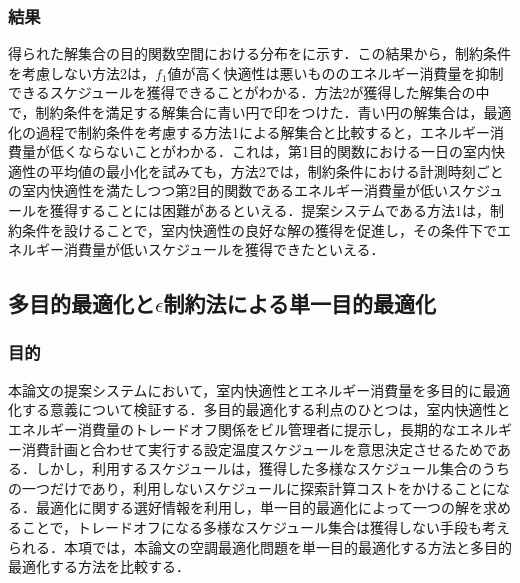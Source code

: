 \subsubsection{結果}
得られた解集合の目的関数空間における分布をに示す．この結果から，制約条件を考慮しない方法2は，$f_1$値が高く快適性は悪いもののエネルギー消費量を抑制できるスケジュールを獲得できることがわかる．方法2が獲得した解集合の中で，制約条件を満足する解集合に青い円で印をつけた．青い円の解集合は，最適化の過程で制約条件を考慮する方法1による解集合と比較すると，エネルギー消費量が低くならないことがわかる．これは，第1目的関数における一日の室内快適性の平均値の最小化を試みても，方法2では，制約条件における計測時刻ごとの室内快適性を満たしつつ第2目的関数であるエネルギー消費量が低いスケジュールを獲得することには困難があるといえる．提案システムである方法1は，制約条件を設けることで，室内快適性の良好な解の獲得を促進し，その条件下でエネルギー消費量が低いスケジュールを獲得できたといえる．


\subsection{多目的最適化と$\epsilon$制約法による単一目的最適化}
\subsubsection{目的}
本論文の提案システムにおいて，室内快適性とエネルギー消費量を多目的に最適化する意義について検証する．多目的最適化する利点のひとつは，室内快適性とエネルギー消費量のトレードオフ関係をビル管理者に提示し，長期的なエネルギー消費計画と合わせて実行する設定温度スケジュールを意思決定させるためである．しかし，利用するスケジュールは，獲得した多様なスケジュール集合のうちの一つだけであり，利用しないスケジュールに探索計算コストをかけることになる．最適化に関する選好情報を利用し，単一目的最適化によって一つの解を求めることで，トレードオフになる多様なスケジュール集合は獲得しない手段も考えられる．本項では，本論文の空調最適化問題を単一目的最適化する方法と多目的最適化する方法を比較する．

